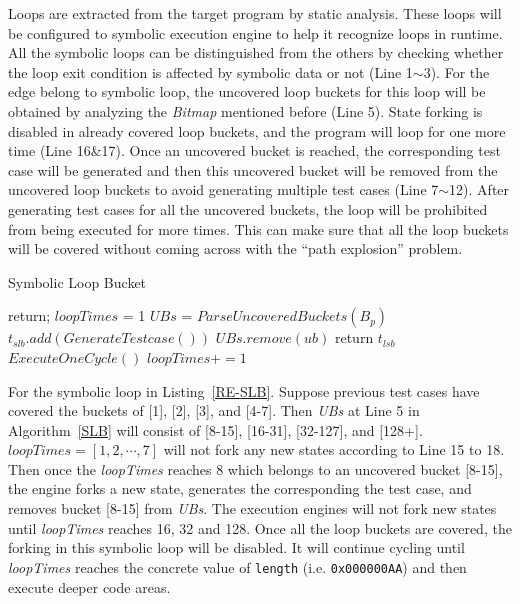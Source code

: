 Loops are extracted from the target program by static analysis. These loops will be configured to symbolic execution engine to help it recognize loops in runtime. All the symbolic loops can be distinguished from the others by checking whether the loop exit condition is affected by symbolic data or not (Line 1$\sim$3). For the edge belong to symbolic loop, the uncovered loop buckets for this loop will be obtained by analyzing the \textit{Bitmap} mentioned before (Line 5). 
State forking is disabled in already covered loop buckets, and the program will loop for one more time (Line 16\&17). Once an uncovered bucket is reached, the corresponding test case will be generated and then this uncovered bucket will be removed from the uncovered loop buckets to avoid generating multiple test cases (Line 7$\sim$12). After generating test cases for all the uncovered buckets, the loop will be prohibited from being executed for more times. This can make sure that all the loop buckets will be covered without coming across with the ``path explosion'' problem.

\begin{algorithm}
  \caption{Symbolic Loop Bucket}
  \label{SLB}
  {
    return;
  }
  $loopTimes$ = 1\;
  $UBs$ = $ParseUncoveredBuckets(B_p)$\;
  {
    {
      {
        $t_{slb}.add(GenerateTestcase())$\;
        $UBs$.$remove(ub)$\;
      }
    }
    {
      return $t_{lsb}$\;
    }{
      $ExecuteOneCycle()$\;
      $loopTimes += 1$\;
    }
  }
\end{algorithm}  

For the symbolic loop in Listing~\ref{RE-SLB}. Suppose previous test cases have covered the buckets of [1], [2], [3], and [4-7]. Then \textit{UBs} at Line 5 in Algorithm~\ref{SLB} will consist of [8-15], [16-31], [32-127], and [128+]. $\textit{loopTimes}=[1, 2, \cdots, 7]$ will not fork any new states according to Line 15 to 18. Then once the \textit{loopTimes} reaches 8 which belongs to an uncovered bucket [8-15], the engine forks a new state,  generates the corresponding the test case, and removes bucket [8-15] from \textit{UBs}. The execution engines will not fork new states until \textit{loopTimes} reaches 16, 32 and 128. Once all the loop buckets are covered, the forking in this symbolic loop will be disabled. It will continue cycling until \textit{loopTimes} reaches the concrete value of \texttt{length} (i.e. \texttt{0x000000AA}) and then execute deeper code areas.

